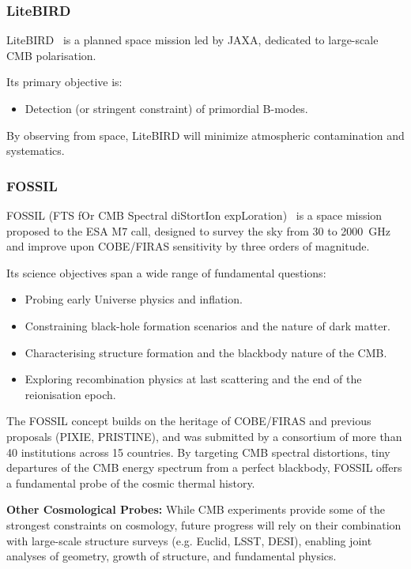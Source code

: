 \documentclass[../../thesis.tex]{subfiles}
\begin{document}
\subsubsection{LiteBIRD}

LiteBIRD~\cite{LiteBIRD2022} is a planned space mission led by JAXA, dedicated to large-scale CMB polarisation.

Its primary objective is:
\begin{itemize}
    \item Detection (or stringent constraint) of primordial B-modes.
\end{itemize}

By observing from space, LiteBIRD will minimize atmospheric contamination and systematics.

\subsubsection{FOSSIL} \label{subsubsec:fossil}

FOSSIL (FTS fOr CMB Spectral diStortIon expLoration)~\cite{FOSSIL2022} is a space mission proposed to the ESA M7 call, designed to survey the sky from 30 to 2000~GHz and improve upon COBE/FIRAS sensitivity by three orders of magnitude.

Its science objectives span a wide range of fundamental questions:
\begin{itemize}
    \item Probing early Universe physics and inflation.
    \item Constraining black-hole formation scenarios and the nature of dark matter.
    \item Characterising structure formation and the blackbody nature of the CMB.
    \item Exploring recombination physics at last scattering and the end of the reionisation epoch.
\end{itemize}

The FOSSIL concept builds on the heritage of COBE/FIRAS and previous proposals (PIXIE, PRISTINE), and was submitted by a consortium of more than 40 institutions across 15 countries. By targeting CMB spectral distortions, tiny departures of the CMB energy spectrum from a perfect blackbody, FOSSIL offers a fundamental probe of the cosmic thermal history.

\bigskip

\noindent
\textbf{Other Cosmological Probes:} While CMB experiments provide some of the strongest constraints on cosmology, future progress will rely on their combination with large-scale structure surveys (e.g. Euclid, LSST, DESI), enabling joint analyses of geometry, growth of structure, and fundamental physics.
\end{document}

